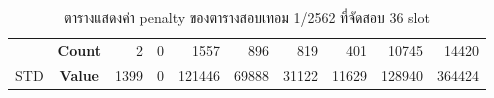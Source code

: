 \begin{table}[]
{\begin{tabular}{@{}ccrrrrrrrr@{}}
    {\color[HTML]{FE0000} }                      & {\color[HTML]{FE0000} \textbf{Count}} & {\color[HTML]{FE0000} 2}       & {\color[HTML]{FE0000} 0}       & {\color[HTML]{FE0000} 1557}    & {\color[HTML]{FE0000} 896}     & {\color[HTML]{FE0000} 819}     & {\color[HTML]{FE0000} 401}     & {\color[HTML]{FE0000} 10745}   & {\color[HTML]{FE0000} 14420}     \\ \cmidrule(l){2-10} 
    \multirow{-2}{*}{{\color[HTML]{FE0000} STD}} & {\color[HTML]{FE0000} \textbf{Value}} & {\color[HTML]{FE0000} 1399}    & {\color[HTML]{FE0000} 0}       & {\color[HTML]{FE0000} 121446}  & {\color[HTML]{FE0000} 69888}   & {\color[HTML]{FE0000} 31122}   & {\color[HTML]{FE0000} 11629}   & {\color[HTML]{FE0000} 128940}  & {\color[HTML]{FE0000} 364424}    \\ \bottomrule
    \end{tabular}%
    }
    \caption{ตารางแสดงค่า penalty ของตารางสอบเทอม 1/2562 ที่จัดสอบ 36 slot}
    \label{tab:result_table_162_36}
\end{table}

